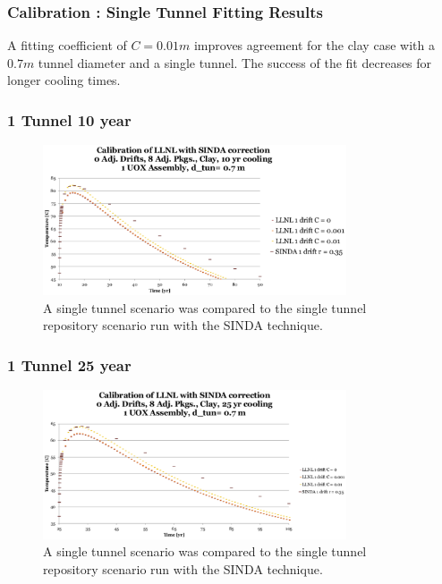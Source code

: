 
\begin{frame}
  \frametitle{Calibration : Single Tunnel Fitting Results}

  A fitting coefficient of $C=0.01m$ improves agreement for the clay 
  case with a $0.7m$ tunnel diameter and a single tunnel. The success of the fit 
  decreases for longer cooling times.
\end{frame}

\begin{frame}[ctb!]

  \frametitle{1 Tunnel 10 year}
  \begin{figure}[h!]
    \begin{center}
      \includegraphics[width=0.8\textwidth]{1drift10yr.eps}
    \end{center}
    \caption{A single tunnel scenario was compared to the single tunnel repository 
    scenario run with the SINDA technique.}
    \label{fig:1drift10yr}
  \end{figure}
  
\end{frame}

\begin{frame}[ctb!]

  \frametitle{1 Tunnel 25 year}
  \begin{figure}[h!]
    \begin{center}
      \includegraphics[width=0.8\textwidth]{1drift25yr.eps}
    \end{center}
    \caption{A single tunnel scenario was compared to the single tunnel repository 
    scenario run with the SINDA technique.}
    \label{fig:1drift10yr}
  \end{figure}
  
\end{frame}

